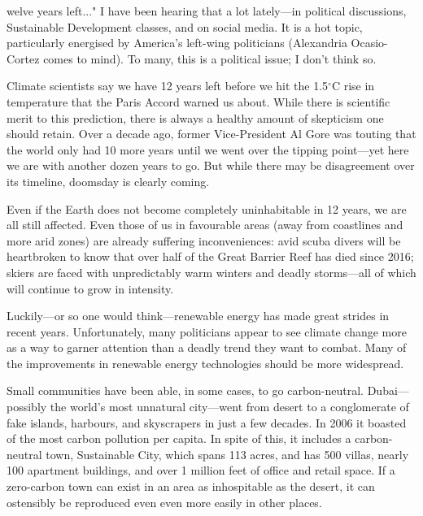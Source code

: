 \label{ch:renewable-energy-tech}

{\flushright{}}
\smallskip


welve years left..." I have been hearing that a lot lately---in
   political discussions, Sustainable Development classes, and on social
   media. It is a hot topic, particularly energised by America's left-wing
   politicians (Alexandria Ocasio-Cortez comes to mind). To many, this is
   a political issue; I don't think so.

   Climate scientists say we have 12 years left before we hit the
   1.5$^{\circ}$C rise in temperature that the Paris Accord warned us
   about. While there is scientific merit to this prediction, there is
   always a healthy amount of skepticism one should retain. Over a decade
   ago, former Vice-President Al Gore was touting that the world only had
   10 more years until we went over the tipping point---yet here we are
   with another dozen years to go. But while there may be disagreement over
   its timeline, doomsday is clearly coming.

   Even if the Earth does not become completely uninhabitable in
   12 years, we are all still affected. Even those of us in favourable
   areas (away from coastlines and more arid zones) are already suffering
   inconveniences: avid scuba divers will be heartbroken to know that over
   half of the Great Barrier Reef has died since 2016; skiers are faced
   with unpredictably warm winters and deadly storms---all of which will
   continue to grow in intensity.

   Luckily---or so one would think---renewable energy has made great
   strides in recent years. Unfortunately, many politicians appear to see
   climate change more as a way to garner attention than a deadly trend
   they want to combat. Many of the improvements in renewable energy
   technologies should be more widespread.

   Small communities have been able, in some cases, to go carbon-neutral.
   Dubai---possibly the world's most unnatural city---went from desert
   to a conglomerate of fake islands, harbours, and skyscrapers in just a
   few decades. In 2006 it boasted of the most carbon pollution per
   capita. In spite of this, it includes a carbon-neutral town,
   Sustainable City, which spans 113 acres, and has 500 villas, nearly 100
   apartment buildings, and over 1 million feet of office and retail
   space. If a zero-carbon town can exist in an area as inhospitable as
   the desert, it can ostensibly be reproduced even even more easily in
   other places.

